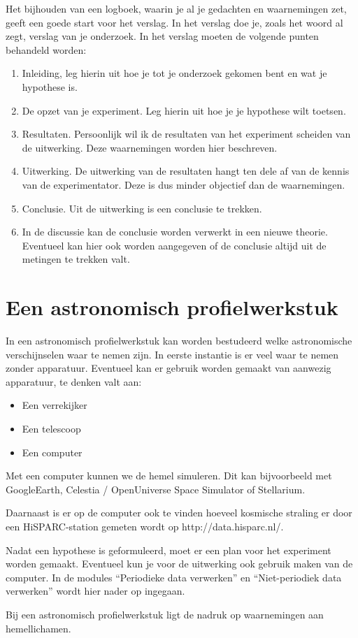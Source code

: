 Het bijhouden van een logboek, waarin je al je gedachten en waarnemingen
zet, geeft een goede start voor het verslag. In het verslag doe je,
zoals het woord al zegt, verslag van je onderzoek. In het verslag
moeten de volgende punten behandeld worden:
\begin{enumerate}
\item Inleiding, leg hierin uit hoe je tot je onderzoek gekomen bent en
wat je hypothese is.
\item De opzet van je experiment. Leg hierin uit hoe je je hypothese wilt
toetsen.
\item Resultaten. Persoonlijk wil ik de resultaten van het experiment scheiden
van de uitwerking. Deze waarnemingen worden hier beschreven.
\item Uitwerking. De uitwerking van de resultaten hangt ten dele af van
de kennis van de experimentator. Deze is dus minder objectief dan
de waarnemingen.
\item Conclusie. Uit de uitwerking is een conclusie te trekken.
\item In de discussie kan de conclusie worden verwerkt in een nieuwe theorie.
Eventueel kan hier ook worden aangegeven of de conclusie altijd uit
de metingen te trekken valt.
\end{enumerate}

\section{Een astronomisch profielwerkstuk}

In een astronomisch profielwerkstuk kan worden bestudeerd welke astronomische
verschijnselen waar te nemen zijn. In eerste instantie is er veel
waar te nemen zonder apparatuur. Eventueel kan er gebruik worden gemaakt
van aanwezig apparatuur, te denken valt aan:
\begin{itemize}
\item Een verrekijker
\item Een telescoop
\item Een computer
\end{itemize}
Met een computer kunnen we de hemel simuleren. Dit kan bijvoorbeeld
met GoogleEarth, Celestia / OpenUniverse Space Simulator of Stellarium.

Daarnaast is er op de computer ook te vinden hoeveel kosmische straling
er door een HiSPARC-station gemeten wordt op http://data.hisparc.nl/.

Nadat een hypothese is geformuleerd, moet er een plan voor het experiment
worden gemaakt. Eventueel kun je voor de uitwerking ook gebruik maken
van de computer. In de modules ``Periodieke data verwerken'' en
``Niet-periodiek data verwerken'' wordt hier nader op ingegaan.

Bij een astronomisch profielwerkstuk ligt de nadruk op waarnemingen
aan hemellichamen.


